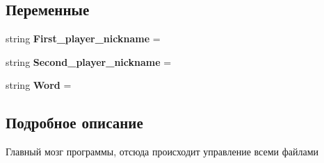 \subsection*{Переменные}
\begin{DoxyCompactItemize}
\item 
\mbox{\label{namespacemain_a89b868324c185a5c978391629365ae96}} 
string {\bfseries First\+\_\+player\+\_\+nickname} = \textquotesingle{}\textquotesingle{}
\item 
\mbox{\label{namespacemain_aeb6bc78a2dedabbabab1e7d1a41c8792}} 
string {\bfseries Second\+\_\+player\+\_\+nickname} = \textquotesingle{}\textquotesingle{}
\item 
\mbox{\label{namespacemain_a58c84facb7caa86067d26dd5b4756cf3}} 
string {\bfseries Word} = \textquotesingle{}\textquotesingle{}
\end{DoxyCompactItemize}


\subsection{Подробное описание}
Главный мозг программы, отсюда происходит управление всеми файлами 

